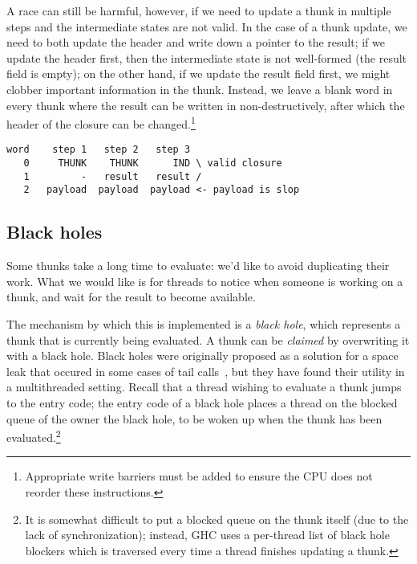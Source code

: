 A race can still be harmful, however, if we need to update a thunk in
multiple steps and the intermediate states are not valid.  In the case
of a thunk update, we need to both update the header and write down a
pointer to the result; if we update the header first, then the
intermediate state is not well-formed (the result field is empty); on
the other hand, if we update the result field first, we might clobber
important information in the thunk.  Instead, we leave a blank word in
every thunk where the result can be written in non-destructively, after
which the header of the closure can be changed.\footnote{Appropriate
write barriers must be added to ensure the CPU does not reorder these
instructions.}

\begin{verbatim}
word    step 1   step 2   step 3
   0     THUNK    THUNK      IND \ valid closure
   1         -   result   result /
   2   payload  payload  payload <- payload is slop
\end{verbatim}

\subsection{Black holes} \label{sec:blackhole}

Some thunks take a long time to evaluate: we'd like to avoid duplicating
their work.  What we would like is for threads to notice when someone is
working on a thunk, and wait for the result to become available.

The mechanism by which this is implemented is a \emph{black hole}, which
represents a thunk that is currently being evaluated.  A thunk can be
\emph{claimed} by overwriting it with a black hole.  Black holes were
originally proposed as a solution for a space leak that occured in some
cases of tail calls~\cite{Jones2008}, but they have found their utility
in a multithreaded setting.  Recall that a thread wishing to evaluate
a thunk jumps to the entry code; the entry code of a black hole
places a thread on the blocked queue of the owner the black hole, to
be woken up when the thunk has been evaluated.\footnote{It is somewhat difficult
to put a blocked queue on the thunk itself (due to the lack of
synchronization); instead, GHC uses a per-thread list of black hole
blockers which is traversed every time a thread finishes updating a
thunk.}


